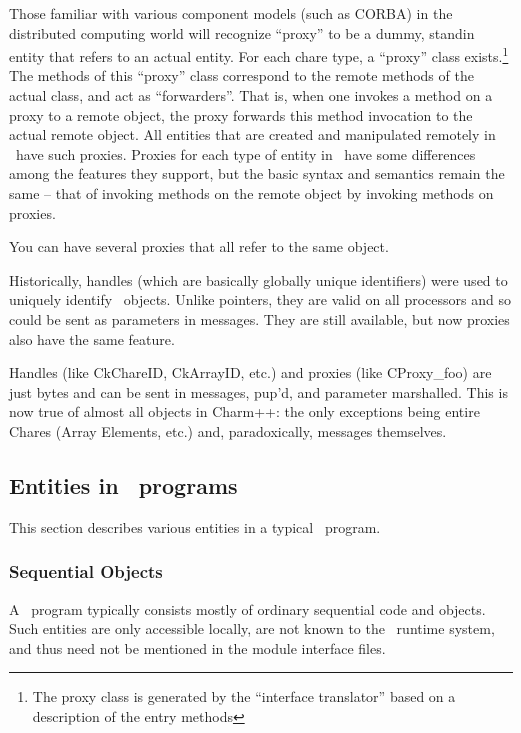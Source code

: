 Those familiar with various component models (such as CORBA) in the
distributed computing world will recognize ``proxy'' to be a dummy, standin
entity that refers to an actual entity.  For each chare type, a ``proxy''
class exists.\footnote{The proxy class is generated by the ``interface
translator'' based on a description of the entry methods}  The methods of
this ``proxy'' class correspond to the remote methods of the actual class, and
act as ``forwarders''. That is, when one invokes a method on a proxy to a
remote object, the proxy forwards this method invocation to the actual
remote object. All entities that are created and manipulated remotely in
\charmpp\ have such proxies. Proxies for each type of entity in \charmpp\
have some differences among the features they support, but the basic syntax
and semantics remain the same -- that of invoking methods on the remote
object by invoking methods on proxies.

You can have several proxies that all refer to the same object.

Historically, handles (which are basically globally unique
identifiers) were used to uniquely identify \charmpp\ objects.  Unlike
pointers, they are valid on all processors and so could be sent as
parameters in messages.  They are still available, but now proxies
also have the same feature.

Handles (like CkChareID, CkArrayID, etc.) and proxies (like
CProxy\_foo) are just bytes and can be sent in messages, pup'd, and
parameter marshalled.  This is now true of almost all objects in
Charm++: the only exceptions being entire Chares (Array Elements,
etc.) and, paradoxically, messages themselves.

\subsection{Entities in \charmpp\ programs}

This section describes various entities in a typical \charmpp\ program.

\subsubsection{Sequential Objects}

A \charmpp\ program typically consists mostly of ordinary sequential \CC
code and objects. Such entities are only accessible locally, are not known
to the \charmpp\ runtime system, and thus need not be mentioned in the
module interface files. 

